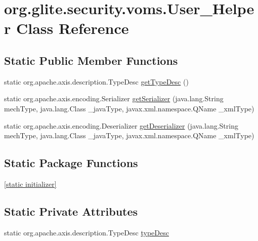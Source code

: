 \hypertarget{classorg_1_1glite_1_1security_1_1voms_1_1User__Helper}{
\section{org.glite.security.voms.User\_\-Helper Class Reference}
\label{classorg_1_1glite_1_1security_1_1voms_1_1User__Helper}
}
\subsection*{Static Public Member Functions}
\begin{DoxyCompactItemize}
\item 
static org.apache.axis.description.TypeDesc \hyperlink{classorg_1_1glite_1_1security_1_1voms_1_1User__Helper_a91c6f877879ad810a8a724d48a29c145}{getTypeDesc} ()
\item 
static org.apache.axis.encoding.Serializer \hyperlink{classorg_1_1glite_1_1security_1_1voms_1_1User__Helper_af3e3514b0c0852c0fed8c4281c52fc5f}{getSerializer} (java.lang.String mechType, java.lang.Class \_\-javaType, javax.xml.namespace.QName \_\-xmlType)
\item 
static org.apache.axis.encoding.Deserializer \hyperlink{classorg_1_1glite_1_1security_1_1voms_1_1User__Helper_a69215c37c6fa24c74b3f7dd6df79f1e0}{getDeserializer} (java.lang.String mechType, java.lang.Class \_\-javaType, javax.xml.namespace.QName \_\-xmlType)
\end{DoxyCompactItemize}
\subsection*{Static Package Functions}
\begin{DoxyCompactItemize}
\item 
\hyperlink{classorg_1_1glite_1_1security_1_1voms_1_1User__Helper_aa589cd2781ce1801861fc70456c71b0b}{\mbox{[}static initializer\mbox{]}}
\end{DoxyCompactItemize}
\subsection*{Static Private Attributes}
\begin{DoxyCompactItemize}
\item 
static org.apache.axis.description.TypeDesc \hyperlink{classorg_1_1glite_1_1security_1_1voms_1_1User__Helper_a38b475b9cb566d11f540f84381db1d5a}{typeDesc}
\end{DoxyCompactItemize}



